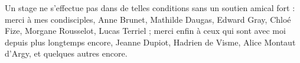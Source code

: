 Un stage ne s'effectue pas dans de telles conditions sans un soutien amical fort : merci à mes condisciples, Anne Brunet, Mathilde Daugas, Edward Gray, Chloé Fize, Morgane Rousselot, Lucas Terriel ; merci enfin à ceux qui sont avec moi depuis plus longtemps encore, Jeanne Dupiot, Hadrien de Visme, Alice Montaut d'Argy, et quelques autres encore.